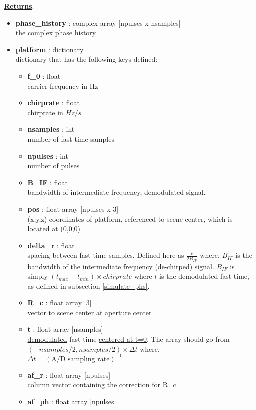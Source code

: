 \documentclass{article}
\newcommand{\defs}[2]{\textbf{{#1}} : {#2}}
\begin{document}
\noindent \underline{\textbf{Returns}}:
\begin{itemize}
	\item \defs{phase\_history}{complex array [npulses x nsamples]}\\
		the complex phase history
	  \item \defs{platform}{dictionary}\\
	  	dictionary that has the following keys defined:
	  \begin{itemize}
	    \item \defs{f\_0}{float}\\
	    	carrier frequency in Hz
		\item \defs{chirprate}{float}\\
		   	chirprate in $Hz/s$
	    \item \defs{nsamples}{int}\\
	    	number of fast time samples
	    \item \defs{npulses}{int}\\
	    	number of pulses
	    \item \defs{B\_IF}{float}\\
	    	bandwidth of intermediate frequency, demodulated signal.
	    \item \defs{pos}{float array [npulses x 3]}\\
	       	(x,y,z) coordinates of platform, referenced to scene center, which is located at (0,0,0)
	    \item \defs{delta\_r}{float}\\
       	   	spacing between fast time samples.  Defined here as $\frac{c}{2B_{IF}}$ where, $B_{IF}$ is the bandwidth of the intermediate frequency (de-chirped) signal.  $B_{IF}$ is simply $(t_{max}-t_{min})\times chirprate$ where $t$ is the demodulated fast time, as defined in subsection \ref{simulate_phs}.
	    \item \defs{R\_c}{float array [3]}\\
	     	vector to scene center at aperture center
	    \item \defs{t}{float array [nsamples]}\\
   	    	\underline{demodulated} fast-time \underline{centered at t=0}.  The array should go from $(-nsamples/2, nsamples/2)\times\Delta t$ where, $\Delta t = (\mbox{A/D sampling rate})^{-1}$
   	    \item\defs{af\_r}{float array [npulses]}\\
   	    	column vector containing the correction for R\_c
	    \item\defs{af\_ph}{float array [npulses]}\\

\end{itemize}
\end{itemize}
\end{document}

